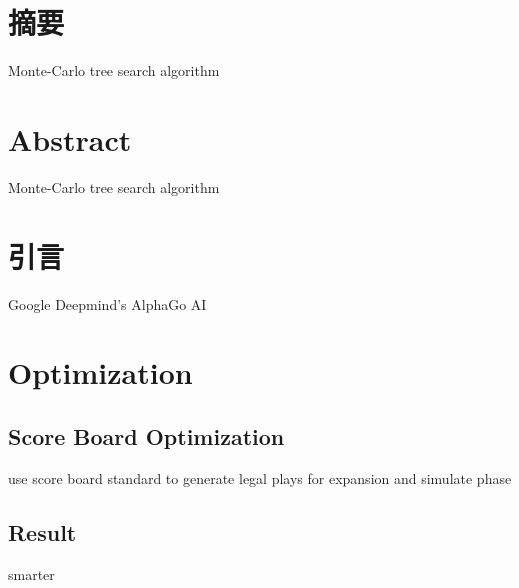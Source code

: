 
\section*{摘要}
Monte-Carlo tree search algorithm\cite{wiki:Monte_Carlo_tree_search}\cite{DBLP:conf/ecml/KocsisS06}\cite{DBLP:conf/aiide/ChaslotBSS08}
\newpage

\section*{Abstract}
Monte-Carlo tree search algorithm\cite{wiki:Monte_Carlo_tree_search}\cite{DBLP:conf/ecml/KocsisS06}\cite{DBLP:conf/aiide/ChaslotBSS08}
\newpage


\tableofcontents
\newpage

\null\thispagestyle{empty}
\newpage


\section{引言}
Google Deepmind's AlphaGo AI\cite{DBLP:journals/nature/SilverHMGSDSAPL16}\cite{silver2017mastering}
\newpage

\section{Optimization}
\subsection{Score Board Optimization}
use score board standard to generate legal plays for expansion and simulate phase
\subsection{Result}
smarter
\newpage



\newpage


